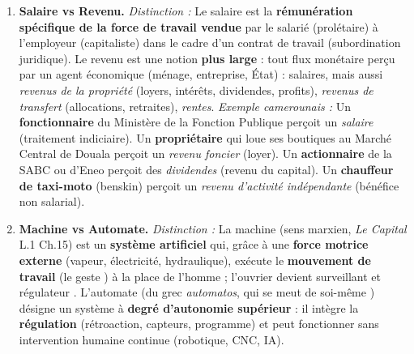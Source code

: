 \documentclass[11pt]{article}
\newcommand{\cle}[1]{{\popxbold\color{popdark}#1}}
\begin{document}
\begin{corrige}
\begin{enumerate}
\emph{Distinction :} Hannah Arendt (\emph{Condition de l'homme moderne}) distingue trois activités fondamentales : 1) Le \emph{labor} (\textbf{travail} au sens étroit) : activité cyclique, liée à la nécessité biologique (manger, entretenir la vie), produit des biens de consommation immédiate, ne laisse rien de durable (correspond à \emph{animal laborans}). 2) Le \emph{work} (\textbf{œuvre} / fabrication) : activité qui \textbf{transforme la nature} pour produire des \textbf{objets durables} (outils, maisons, œuvres d'art, institutions), bâtit un \emph{monde} artificiel humain (correspond à \emph{homo faber}). 3) L'\emph{action} : seule activité \textbf{politique}, déploiement de la parole et de l'acte entre égaux dans l'espace public, révélation de \guillemotleft qui \guillemotright je suis, fondement de la liberté (correspond à \emph{zoon politikon}).
\emph{Exemple camerounais :} Un paysan du Nord qui \textbf{laboure son champ de mil} chaque saison pour nourrir sa famille accomplit du \emph{labor}. Un \textbf{maçon à Yaoundé} qui bâtit une maison en parpaings accomplit du \emph{work} (il laisse un objet durable). Un \textbf{militant syndical} qui prend la parole lors d'une assemblée générale à la Bourse du Travail de Douala pour défendre les droits des travailleurs accomplit de l'\emph{action}.
\item \textbf{Salaire vs Revenu.}
\emph{Distinction :} Le \cle{salaire} est la \textbf{rémunération spécifique de la force de travail vendue} par le salarié (prolétaire) à l'employeur (capitaliste) dans le cadre d'un contrat de travail (subordination juridique). Le \cle{revenu} est une notion \textbf{plus large} : tout flux monétaire perçu par un agent économique (ménage, entreprise, État) : salaires, mais aussi \emph{revenus de la propriété} (loyers, intérêts, dividendes, profits), \emph{revenus de transfert} (allocations, retraites), \emph{rentes}.
\emph{Exemple camerounais :} Un \textbf{fonctionnaire} du Ministère de la Fonction Publique perçoit un \emph{salaire} (traitement indiciaire). Un \textbf{propriétaire} qui loue ses boutiques au Marché Central de Douala perçoit un \emph{revenu foncier} (loyer). Un \textbf{actionnaire} de la SABC ou d'Eneo perçoit des \emph{dividendes} (revenu du capital). Un \textbf{chauffeur de taxi-moto} (benskin) perçoit un \emph{revenu d'activité indépendante} (bénéfice non salarial).
\item \textbf{Machine vs Automate.}
\emph{Distinction :} La \cle{machine} (sens marxien, \emph{Le Capital} L.1 Ch.15) est un \textbf{système artificiel} qui, grâce à une \textbf{force motrice externe} (vapeur, électricité, hydraulique), exécute le \textbf{mouvement de travail} (le \guillemotleft geste \guillemotright) à la place de l'homme ; l'ouvrier devient \guillemotleft surveillant et régulateur \guillemotright. L'\cle{automate} (du grec \emph{automatos}, \guillemotleft qui se meut de soi-même \guillemotright) désigne un système à \textbf{degré d'autonomie supérieur} : il intègre la \textbf{régulation} (rétroaction, capteurs, programme) et peut fonctionner sans intervention humaine continue (robotique, CNC, IA).

\end{enumerate}
\end{corrige}
\end{document}
